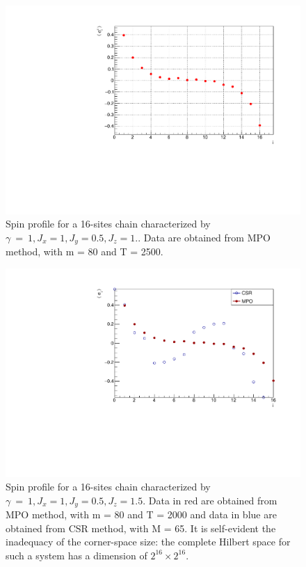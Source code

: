 \begin{figure}[H]
    \centering
    \includegraphics[scale=0.7]{Figures/16sites/LML016m080Time002500_J1051.pdf}
    \caption{Spin profile for a 16-sites chain characterized by $\gamma~=~1, J_x=1, J_y=0.5, J_z=1.$. Data are obtained from MPO method, with m = 80 and T = 2500.}
    \label{fig:my_label}
\end{figure}

\begin{figure}[H]
    \centering
    \includegraphics[scale=0.7]{Figures/16sites/LMComparison16s1051.pdf}
    \caption{Spin profile for a 16-sites chain characterized by $\gamma~=~1, J_x=1, J_y=0.5, J_z=1.5$. Data in red are obtained from MPO method, with m = 80 and T = 2000 and data in blue are obtained from CSR method, with M = 65. It is self-evident the inadequacy of the corner-space size: the complete Hilbert space for such a system has a dimension of $2^{16} \times 2^{16}$.}
    \label{fig:my_label}
\end{figure}

